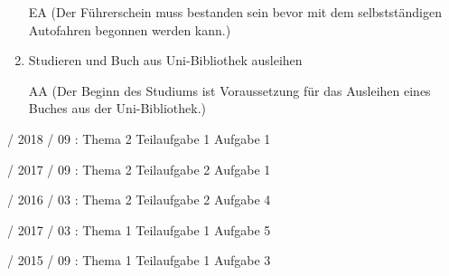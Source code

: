 \documentclass{lehramt-informatik}
\begin{document}
\begin{enumerate}
\begin{antwort}
EA (Der Führerschein muss bestanden sein bevor mit dem selbstständigen
Autofahren begonnen werden kann.)
\end{antwort}


\item Studieren und Buch aus Uni-Bibliothek ausleihen

\begin{antwort}
AA (Der Beginn des Studiums ist Voraussetzung für das Ausleihen eines
Buches aus der Uni-Bibliothek.)
\end{antwort}
\end{enumerate}

%

 / 2018 / 09 : Thema 2 Teilaufgabe 1 Aufgabe 1

%

 / 2017 / 09 : Thema 2 Teilaufgabe 2 Aufgabe 1

%

 / 2016 / 03 : Thema 2 Teilaufgabe 2 Aufgabe 4

%

 / 2017 / 03 : Thema 1 Teilaufgabe 1 Aufgabe 5

%

 / 2015 / 09 : Thema 1 Teilaufgabe 1 Aufgabe 3

\literatur
\end{document}

